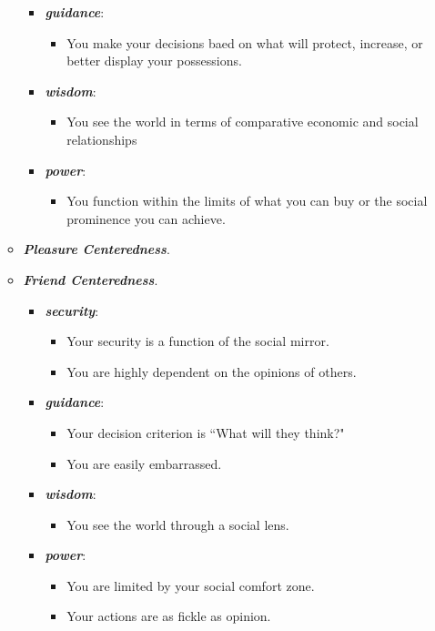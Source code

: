 \documentclass[11pt]{article}
\begin{document}
\begin{itemize}
\begin{itemize}
\begin{itemize}
\item \emph{\textbf{guidance}}:
\begin{itemize}
\item You make  your decisions baed on what will protect, increase, or better display your possessions.
\end{itemize}
  
\item \emph{\textbf{wisdom}}:
\begin{itemize}
\item You see the world in terms of comparative economic and social relationships
\end{itemize}

\item \emph{\textbf{power}}:
\begin{itemize}
\item You function within the limits of what you can buy or the social prominence you can achieve.
\end{itemize}
\end{itemize}

\item \emph{\textbf{Pleasure Centeredness}}.

\item \emph{\textbf{Friend Centeredness}}.
\begin{itemize}
\item \emph{\textbf{security}}: 
\begin{itemize}
\item Your security is a function of the social mirror.
\item You are highly dependent on the opinions of others.
\end{itemize}
  
\item \emph{\textbf{guidance}}:
\begin{itemize}
\item Your decision criterion is ``What will they think?"
\item You are easily embarrassed.
\end{itemize}
  
\item \emph{\textbf{wisdom}}:
\begin{itemize}
\item You see the world through a social lens.
\end{itemize}

\item \emph{\textbf{power}}:
\begin{itemize}
\item You are limited by your social comfort zone.
\item Your actions are as fickle as opinion.
\end{itemize}
\end{itemize}


\end{itemize}
\end{itemize}
\end{document}
